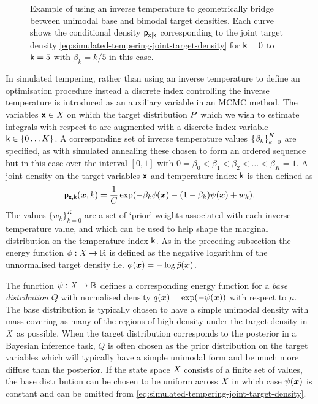 \begin{figure}[t]
\centering
{}
\caption[Geometric density bridge example.]{Example of using an inverse temperature to geometrically bridge between unimodal base and bimodal target densities. Each curve shows the conditional density $\mathsf{p}_{\mathsf{x}|\mathsf{k}}$ corresponding to the joint target density \eqref{eq:simulated-tempering-joint-target-density} for $\mathsf{k}=0$ to $\mathsf{k}=5$ with $\beta_k = k / 5$ in this case.}
\label{fig:geometric-bridge-example}
\end{figure}

In simulated tempering, rather than using an inverse temperature to define an optimisation procedure instead a discrete index controlling the inverse temperature is introduced as an auxiliary variable in an \ac{MCMC} method. The variables $\boldsymbol{\mathsf{x}} \in \mathit{X}$ on which the target distribution $P$ which we wish to estimate integrals with respect to are augmented with a discrete index variable $\rvar{k} \in \fset{0 \dots K}$.  A corresponding set of inverse temperature values $\fset{\beta_k}_{k=0}^K$ are specified, as with simulated annealing these chosen to form an ordered sequence but in this case over the interval $[0,1]$ with $0 = \beta_0 < \beta_1 < \beta_2 < \dots < \beta_K =1$. A joint density on the target variables $\boldsymbol{\mathsf{x}}$ and temperature index $\mathsf{k}$ is then defined as
\begin{equation}\label{eq:simulated-tempering-joint-target-density}
  \pden{\rvct{x},\rvar{k}}(\vct{x},k) = \frac{1}{C}
  \exp\lpa - \beta_k \phi(\vct{x}) - (1 - \beta_k) \psi(\vct{x}) + w_k\rpa.
\end{equation}
The values $\lbrace w_k \rbrace_{k=0}^K$ are a set of `prior' weights associated with each inverse temperature value, and which can be used to help shape the marginal distribution on the temperature index $\mathsf{k}$. As in the preceding subsection the energy function $\phi : \mathit{X} \to \mathbb{R}$ is defined as the negative logarithm of the unnormalised target density i.e. $\phi(\boldsymbol{x}) = -\log \tilde{p}(\boldsymbol{x})$. 

The function $\psi : \mathit{X} \to \mathbb{R}$ defines a corresponding energy function for a \emph{base distribution} $Q$ with {normalised} density $q(\vct{x}) = \exp\lpa-\psi(\vct{x})\rpa$ with respect to $\mu$. The base distribution is typically chosen to have a simple unimodal density with mass covering as many of the regions of high density under the target density in $\mathit{X}$ as possible. When the target distribution corresponds to the posterior in a Bayesian inference task, $Q$ is often chosen as the prior distribution on the target variables which will typically have a simple unimodal form and be much more diffuse than the posterior. If the state space $\mathit{X}$ consists of a finite set of values, the base distribution can be chosen to be uniform across $\mathit{X}$ in which case $\psi(\boldsymbol{x})$ is constant and can be omitted from \eqref{eq:simulated-tempering-joint-target-density}.

